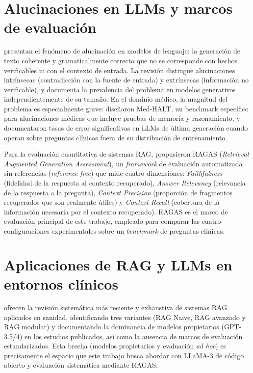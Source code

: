 \documentclass[11pt,a4paper,spanish]{book}
\numberwithin{equation}{chapter}
\numberwithin{figure}{chapter}
\begin{document}
\section{Alucinaciones en LLMs y marcos de evaluación}

 presentan el fenómeno de alucinación en modelos de lenguaje: la generación de texto coherente y gramaticalmente correcto que no se corresponde con hechos verificables ni con el contexto de entrada. La revisión distingue alucinaciones intrínsecas (contradicción con la fuente de entrada) y extrínsecas (información no verificable), y documenta la prevalencia del problema en modelos generativos independientemente de su tamaño. En el dominio médico, la magnitud del problema es especialmente grave:  diseñaron Med-HALT, un benchmark específico para alucinaciones médicas que incluye pruebas de memoria y razonamiento, y documentaron tasas de error significativas en LLMs de última generación cuando operan sobre preguntas clínicas fuera de su distribución de entrenamiento.

Para la evaluación cuantitativa de sistemas RAG,  propusieron RAGAS (\textit{Retrieval Augmented Generation Assessment}), un \textit{framework} de evaluación automatizada sin referencias (\textit{reference-free}) que mide cuatro dimensiones: \textit{Faithfulness} (fidelidad de la respuesta al contexto recuperado), \textit{Answer Relevancy} (relevancia de la respuesta a la pregunta), \textit{Context Precision} (proporción de fragmentos recuperados que son realmente útiles) y \textit{Context Recall} (cobertura de la información necesaria por el contexto recuperado). RAGAS es el marco de evaluación principal de este trabajo, empleado para comparar las cuatro configuraciones experimentales sobre un \textit{benchmark} de preguntas clínicas.

\section{Aplicaciones de RAG y LLMs en entornos clínicos}

 ofrecen la revisión sistemática más reciente y exhaustiva de sistemas RAG aplicados en sanidad, identificando tres variantes (RAG Naive, RAG avanzado y RAG modular) y documentando la dominancia de modelos propietarios (GPT-3.5/4) en los estudios publicados, así como la ausencia de marcos de evaluación estandarizados. Esta brecha (modelos propietarios y evaluación \textit{ad hoc}) es precisamente el espacio que este trabajo busca abordar con LLaMA-3 de código abierto y evaluación sistemática mediante RAGAS.
\end{document}

